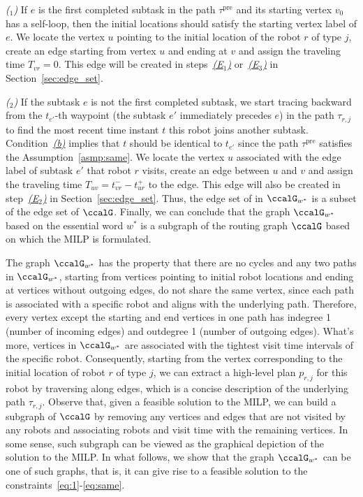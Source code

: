 \documentclass[Afour,sageh,times]{sagej}
\newcounter{mycounter}
\begin{document}
{{\it ($_1$)} If $e$ is the first completed subtask in the path $\tau^\text{pre}$ and its starting vertex $v_0$ has a self-loop, then the initial locations should satisfy the starting vertex label of $e$. We locate the vertex $u$ pointing to the initial location of the robot $r$ of type $j$, create an edge starting from vertex $u$ and ending at $v$ and assign the traveling time $T_{vr}=0$. This edge will be created in steps~\hyperref[edge:vertex1]{\it (E$_1$)} or~\hyperref[edge:vertex2]{\it (E$_3$)} in Section~\ref{sec:edge_set}.

{\it ($_2$)} If  the subtask $e$ is not the first completed subtask, we start tracing backward from the $t_{e'}$-th waypoint (the subtask $e'$ immediately precedes  $e$) in the path $\tau_{r,j}$ to find the most recent time instant $t$ this robot joins another subtask. Condition~\hyperref[asmp:b]{\it (b)} implies that $t$ should be identical to $t_{e'}$ since the path $\tau^\text{pre}$ satisfies the Assumption~\ref{asmp:same}.  We locate the vertex $u$ associated with the edge label of subtask $e'$ that robot $r$ visits, create an edge between $u$ and $v$ and assign the traveling time $T_{uv} = t_{vr}^- - t_{ur}^+$ to the edge. This edge will also be created in step~\hyperref[edge:vertex2]{\it (E$_2$)} in Section~\ref{sec:edge_set}.  Thus, the edge set of in $\ccalG_{w^*}$ is a subset of the edge set of $\ccalG$. Finally, we can conclude that the graph $\ccalG_{w^*}$ based on the essential word $w^*$ is a subgraph of the routing graph $\ccalG$ based on which the MILP is formulated.


The graph $\ccalG_{w^*}$ has the property that there are no cycles and any two paths in $\ccalG_{w^*}$, starting from vertices pointing to initial robot locations  and ending at vertices without outgoing edges, do not share the same vertex, since each path is associated with a specific robot and aligns with the underlying path. Therefore, every vertex except the starting and end vertices in one path has indegree 1 (number of incoming edges) and outdegree 1 (number of outgoing edges). What's more, vertices in $\ccalG_{w^*}$ are associated with the tightest visit time intervals of the specific robot. Consequently, starting from the vertex corresponding to the initial location of robot $r$ of type $j$, we can extract a high-level plan $p_{r,j}$ for this robot by traversing along edges, which is a concise description of the underlying path $\tau_{r,j}$. Observe that, given a feasible solution to the MILP, we can build a subgraph of $\ccalG$ by removing any vertices and edges that are not visited by any robots and associating robots and visit time with the remaining vertices. In some sense, such subgraph can be viewed as the graphical depiction of the solution to the MILP. In what follows, we show that the graph $\ccalG_{w^*}$ can be one of such graphs, that is, it can give rise to a feasible solution to the constraints~\eqref{eq:1}-\eqref{eq:same}.

}
\end{document}
